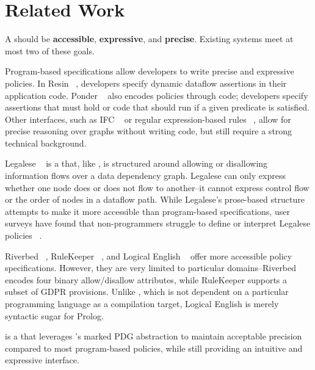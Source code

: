 \chapter{Related Work}

A \policylang{} should be \textbf{accessible}, \textbf{expressive}, and \textbf{precise}.
%
Existing systems meet at most two of these goals.
%

Program-based specifications allow developers to write precise and expressive policies.
%
In Resin ~\cite{resin}, developers specify dynamic dataflow assertions in their application code.
%
Ponder ~\cite{ponder} also encodes policies through code; developers specify assertions that must hold or code that should run if a given predicate is satisfied.
%
Other interfaces, such as IFC ~\cite{jif} or regular expression-based rules ~\cite{hotnets}, 
allow for precise reasoning over graphs without writing code, but still require a strong technical background.

Legalese ~\cite{legalese} is a \policylang{} that, like \syslang, is structured around allowing or disallowing information flows over a data dependency graph.
%
Legalese can only express whether one node does or does not flow to another--it cannot express control flow or the order of nodes in a dataflow path.
%
%
While Legalese's prose-based structure attempts to make it more accessible than program-based specifications, 
user surveys have found that non-programmers struggle to define or interpret Legalese policies ~\cite{legalese, privguard}.

Riverbed ~\cite{riverbed}, RuleKeeper ~\cite{rulekeeper}, and Logical English ~\cite{logical-english} offer more accessible policy specifications.
%
However, they are very limited to particular domains--Riverbed encodes four binary allow/disallow attributes, while RuleKeeper supports a subset of GDPR provisions.
%
Unlike \syslang, which is not dependent on a particular programming language as a compilation target, Logical English is merely syntactic sugar for Prolog.

\syslang{} is a \policylang{} that leverages \sys{}'s marked PDG abstraction to maintain acceptable precision compared to most program-based policies,
while still providing an intuitive and expressive interface.
